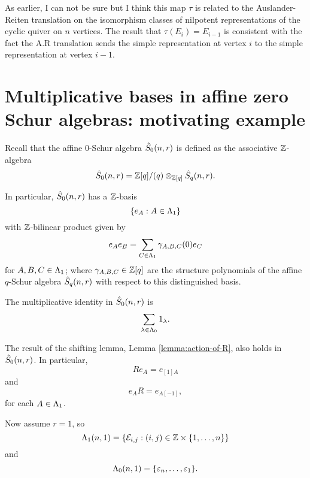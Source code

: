 \documentclass[a4paper, 11pt]{report}
\begin{document}
{\color{blue}As earlier, I can not be sure but I think this map $\tau$ is related to the Auslander-Reiten translation on the isomorphism classes of nilpotent representations of the cyclic quiver on $n$ vertices. The result that $\tau(E_i)=  E_{i-1}$ is consistent with the fact the A.R translation sends the simple representation at vertex $i$ to the simple representation at vertex $i-1$.}

\section{Multiplicative bases in affine zero Schur algebras: motivating example}

Recall that the affine $0$-Schur algebra $\zeroschur$ is defined as the associative $\integers$-algebra
\begin{equation*}
\zeroschur = {\integers[q]}/{(q)}\otimes_{\integers[q]} \qschur.
\end{equation*}

In particular, $\zeroschur$ has a $\integers$-basis
\begin{equation*}
\{e_A:A\in\matrices\}
\end{equation*}
with $\integers$-bilinear product given by
\begin{equation*}
e_A e_B = \sum_{C\in\matrices} \gamma_{A,B,C}(0) e_C
\end{equation*}
for $A,B,C\in\matrices$; where $\gamma_{A,B,C}\in\integers[q]$ are the structure polynomials of the affine $q$-Schur algebra $\qschur$ with respect to this distinguished basis.

The multiplicative identity in $\zeroschur$ is
\begin{equation*}
\sum_{\lambda\in\compositions} 1_\lambda.
\end{equation*}

The result of the shifting lemma, Lemma \ref{lemma:action-of-R}, also holds in $\zeroschur$. In particular,
\begin{equation*}
Re_A = e_{[1]A}
\end{equation*}
and
\begin{equation*}
e_A R = e_{A[-1]},
\end{equation*}
for each $A\in\matrices$.

Now assume $r=1$, so
\begin{equation*}
\matrices[(n,1)] = \{\elem{i}{j}:(i,j)\in\integers\times\{1,\ldots,n\}\}
\end{equation*}
and
\begin{equation*}
\compositions[(n,1)] = \{\epsilon_n,\ldots,\epsilon_1\}.
\end{equation*}
\end{document}
